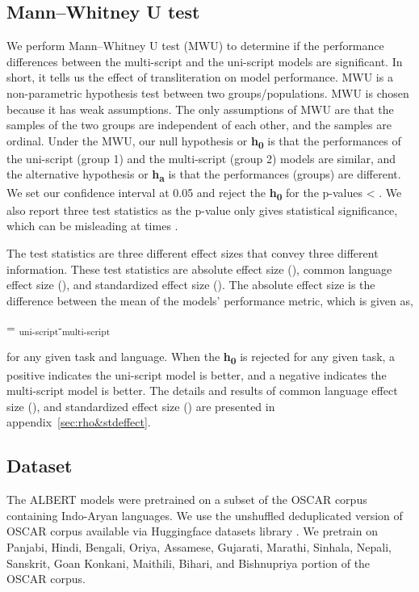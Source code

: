 \documentclass[11pt]{article}
\begin{document}
\subsection{Mann–Whitney U test}
\label{statistical-analysis}
We perform Mann–Whitney U test (MWU) \citep{10.1214/aoms/1177730491, Wilcoxon1945} to determine if the performance differences between the multi-script and the uni-script models are significant. In short, it tells us the effect of transliteration on model performance. 
MWU is a non-parametric hypothesis test between two groups/populations. MWU is chosen because it has weak assumptions. The only assumptions of MWU are that the samples of the two groups are independent of each other, and the samples are ordinal. Under the MWU, our null hypothesis or \textbf{h\textsubscript{0}} is that the performances of the uni-script (group 1) and the multi-script (group 2) models are similar, and the alternative hypothesis or \textbf{h\textsubscript{a}} is that the performances (groups) are different. We set our confidence interval  at 0.05 and reject the \textbf{h\textsubscript{0}} for the p-values < . We also report three test statistics as the p-value only gives statistical significance, which can be misleading at times \citep{pmid23997866}.

The test statistics are three different effect sizes that convey three different information. These test statistics are absolute effect size (), common language effect size (), and standardized effect size (). The absolute effect size  is the difference between the mean of the models' performance metric, which is given as, 
\begin{center} = \textsubscript{uni-script}-\textsubscript{multi-script}\end{center}
for any given task and language. When the \textbf{h\textsubscript{0}} is rejected for any given task, a positive  indicates the uni-script model is better, and a negative  indicates the multi-script model is better. The details and results of common language effect size (), and standardized effect size () are presented in appendix~\ref{sec:rho&stdeffect}.
\subsection{Dataset}
\label{dataset}
The ALBERT models were pretrained on a subset of the OSCAR corpus containing Indo-Aryan languages.
We use the unshuffled deduplicated version of OSCAR corpus \citep{OrtizSuarezSagotRomary2019} available via Huggingface datasets library \citep{lhoest-etal-2021-datasets}. We pretrain on Panjabi, Hindi, Bengali, Oriya, Assamese, Gujarati, Marathi, Sinhala, Nepali, Sanskrit, Goan Konkani, Maithili, Bihari, and Bishnupriya portion of the OSCAR corpus.
\end{document}
